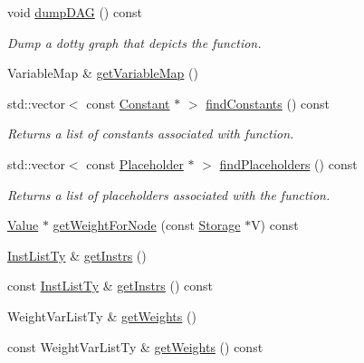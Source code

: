 \begin{DoxyCompactItemize}
void \hyperlink{classglow_1_1_i_r_function_aa6168d2cbbaa221b4f3fac7183332200}{dump\+D\+AG} () const
\begin{DoxyCompactList}\small\item\em Dump a dotty graph that depicts the function. \end{DoxyCompactList}\item 
Variable\+Map \& \hyperlink{classglow_1_1_i_r_function_afbbe6354fff6b20e0bf625d98e635122}{get\+Variable\+Map} ()
\item 
\mbox{\label{classglow_1_1_i_r_function_ae0257baa175ef21e96da12dd79849982}} 
std\+::vector$<$ const \hyperlink{classglow_1_1_constant}{Constant} $\ast$ $>$ \hyperlink{classglow_1_1_i_r_function_ae0257baa175ef21e96da12dd79849982}{find\+Constants} () const
\begin{DoxyCompactList}\small\item\em Returns a list of constants associated with function. \end{DoxyCompactList}\item 
\mbox{\label{classglow_1_1_i_r_function_a6f81abb6cf86f8eb22b947a54541ab4f}} 
std\+::vector$<$ const \hyperlink{classglow_1_1_placeholder}{Placeholder} $\ast$ $>$ \hyperlink{classglow_1_1_i_r_function_a6f81abb6cf86f8eb22b947a54541ab4f}{find\+Placeholders} () const
\begin{DoxyCompactList}\small\item\em Returns a list of placeholders associated with the function. \end{DoxyCompactList}\item 
\hyperlink{classglow_1_1_value}{Value} $\ast$ \hyperlink{classglow_1_1_i_r_function_ad4d42412e7c2532d1ab2de26c632582a}{get\+Weight\+For\+Node} (const \hyperlink{classglow_1_1_storage}{Storage} $\ast$V) const
\item 
\hyperlink{classglow_1_1_tagged_list}{Inst\+List\+Ty} \& \hyperlink{classglow_1_1_i_r_function_a79a1864f27ee4ae0289e2ede9876ea88}{get\+Instrs} ()
\item 
const \hyperlink{classglow_1_1_tagged_list}{Inst\+List\+Ty} \& \hyperlink{classglow_1_1_i_r_function_a5f9664e97529ed80dd6e1a2efe742b1f}{get\+Instrs} () const
\item 
Weight\+Var\+List\+Ty \& \hyperlink{classglow_1_1_i_r_function_aecff6fd57fe2f0390545d88b3561ffcb}{get\+Weights} ()
\item 
const Weight\+Var\+List\+Ty \& \hyperlink{classglow_1_1_i_r_function_a58d8ca16575cd947d9b44fcafddfd18f}{get\+Weights} () const

\end{DoxyCompactItemize}

